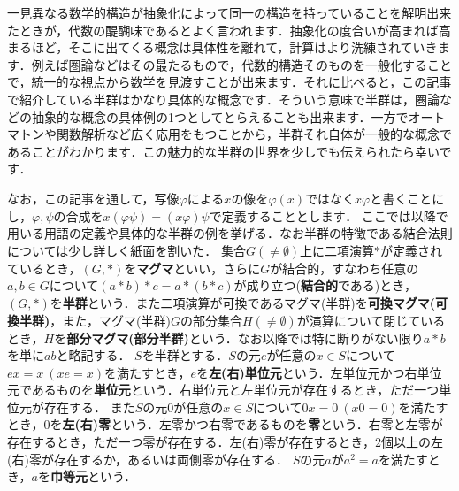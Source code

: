 %


一見異なる数学的構造が抽象化によって同一の構造を持っていることを解明出来たときが，代数の醍醐味であるとよく言われます．抽象化の度合いが高まれば高まるほど，そこに出てくる概念は具体性を離れて，計算はより洗練されていきます．例えば圏論などはその最たるもので，代数的構造そのものを一般化することで，統一的な視点から数学を見渡すことが出来ます．それに比べると，この記事で紹介している半群はかなり具体的な概念です．そういう意味で半群は，圏論などの抽象的な概念の具体例の1つとしてとらえることも出来ます．一方でオートマトンや関数解析など広く応用をもつことから，半群それ自体が一般的な概念であることがわかります．この魅力的な半群の世界を少しでも伝えられたら幸いです．\par
なお，この記事を通して，写像$\varphi$による$x$の像を$\varphi(x)$ではなく$x\varphi$と書くことにし，$\varphi,\psi$の合成を$x(\varphi\psi)=(x\varphi)\psi$で定義することとします．
ここでは以降で用いる用語の定義や具体的な半群の例を挙げる．なお半群の特徴である結合法則については少し詳しく紙面を割いた．
 集合$G(\neq\emptyset)$上に二項演算$*$が定義されているとき，$(G,*)$を{\bf マグマ}といい，さらに$G$が結合的，すなわち任意の$a,b\in G$について$(a*b)*c=a*(b*c)$が成り立つ({\bf 結合的}である)とき，$(G,*)$を{\bf 半群}という．また二項演算が可換であるマグマ(半群)を{\bf 可換マグマ(可換半群)}，また，マグマ(半群)$G$の部分集合$H(\neq\emptyset)$が演算について閉じているとき，$H$を{\bf 部分マグマ(部分半群)}という．なお以降では特に断りがない限り$a*b$を単に$ab$と略記する．
$S$を半群とする．$S$の元$e$が任意の$x\in S$について$ex=x\:(xe=x)$を満たすとき，$e$を{\bf 左(右)単位元}という．左単位元かつ右単位元であるものを{\bf 単位元}という．右単位元と左単位元が存在するとき，ただ一つ単位元が存在する．
\newline
 また$S$の元$0$が任意の$x\in S$について$0x=0\:(x0=0)$を満たすとき，$0$を{\bf 左(右)零}という．左零かつ右零であるものを{\bf 零}という．右零と左零が存在するとき，ただ一つ零が存在する．左(右)零が存在するとき，2個以上の左(右)零が存在するか，あるいは両側零が存在する．
\newline
 $S$の元$a$が$a^2=a$を満たすとき，$a$を{\bf 巾等元}という．
